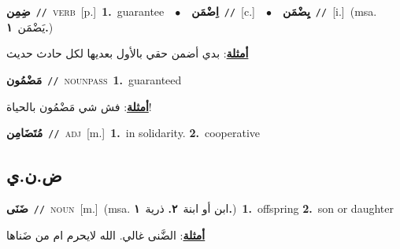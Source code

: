 \documentclass[10pt,a4paper,twoside]{article} %
\begin{document}
\begin{multicols}{2}
{\setlength\topsep{0pt}\textbf{\foreignlanguage{arabic}{ضِمِن}}\ {\color{gray}\texttt{//}\color{black}}\ \textsc{verb}\ [p.]\ \textbf{1.}~guarantee\ \ $\bullet$\ \ \setlength\topsep{0pt}\textbf{\foreignlanguage{arabic}{اِضْمَن}}\ {\color{gray}\texttt{//}\color{black}}\ [c.]\ \ $\bullet$\ \ \setlength\topsep{0pt}\textbf{\foreignlanguage{arabic}{يِضْمَن}}\ {\color{gray}\texttt{//}\color{black}}\ [i.]\ \color{gray}(msa. \foreignlanguage{arabic}{يَضْمَن}~\foreignlanguage{arabic}{\textbf{١.}})\color{black}\  \begin{flushright}\color{gray}\foreignlanguage{arabic}{\textbf{\underline{\foreignlanguage{arabic}{أمثلة}}}: بدي أضمن حقي بالأول بعديها لكل حادث حديث}\end{flushright}\color{black}} \vspace{2mm}

{\setlength\topsep{0pt}\textbf{\foreignlanguage{arabic}{مَضْمُون}}\ {\color{gray}\texttt{//}\color{black}}\ \textsc{noun\textunderscore pass}\ \textbf{1.}~guaranteed\  \begin{flushright}\color{gray}\foreignlanguage{arabic}{\textbf{\underline{\foreignlanguage{arabic}{أمثلة}}}: فش شي مَضْمُون بالحياة!}\end{flushright}\color{black}} \vspace{2mm}

{\setlength\topsep{0pt}\textbf{\foreignlanguage{arabic}{مُتَضَامِن}}\ {\color{gray}\texttt{//}\color{black}}\ \textsc{adj}\ [m.]\ \textbf{1.}~in solidarity.  \textbf{2.}~cooperative\ } \vspace{2mm}

\vspace{-3mm}
\subsection*{\color{blue}\foreignlanguage{arabic}{ض.ن.ي}\color{blue}{}} 

{\setlength\topsep{0pt}\textbf{\foreignlanguage{arabic}{ضَنَى}}\ {\color{gray}\texttt{//}\color{black}}\ \textsc{noun}\ [m.]\ \color{gray}(msa. \foreignlanguage{arabic}{ابن أو ابنة}~\foreignlanguage{arabic}{\textbf{٢.}}  \foreignlanguage{arabic}{ذرية}~\foreignlanguage{arabic}{\textbf{١.}})\color{black}\ \textbf{1.}~offspring  \textbf{2.}~son or daughter\  \begin{flushright}\color{gray}\foreignlanguage{arabic}{\textbf{\underline{\foreignlanguage{arabic}{أمثلة}}}: الضَّنى غالي. الله لايحرم ام من ضَناها}\end{flushright}\color{black}} \vspace{2mm}


\end{multicols}
\end{document}
